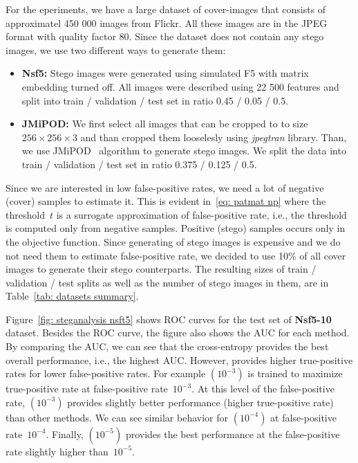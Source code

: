 For the eperiments, we have a large dataset of cover-images that consists of approximatel 450 000 images from Flickr. All these images are in the JPEG format with quality factor 80. Since the dataset does not contain any stego images, we use two different ways to generate them:
\begin{itemize}
  \item \textbf{Nsf5:} Stego images were generated using simulated F5 with matrix embedding turned off. All images were described using 22 500 features and split into train / validation / test set in ratio 0.45 / 0.05 / 0.5.
  \item  \textbf{JMiPOD:} We first select all images that can be cropped to to size $256 \times 256 \times 3$ and than cropped them looselesly using \emph{jpegtran} library. Than, we use JMiPOD~\cite{cogranne2020steganography} algorithm to generate stego images. We split the data into train / validation / test set in ratio 0.375 / 0.125 / 0.5.
\end{itemize}
Since we are interested in low false-positive rates, we need a lot of negative (cover) samples to estimate it. This is evident in~\eqref{eq: patmat np} where the threshold~$t$ is a surrogate approximation of false-positive rate, i.e., the threshold is computed only from negative samples. Positive (stego) samples occurs only in the objective function. Since generating of stego images is expensive and we do not need them to estimate false-positive rate, we decided to use 10\% of all cover images to generate their stego counterparts. The resulting sizes of train / validation / test splits as well as the number of stego images in them, are in Table~\ref{tab: datasets summary}.

Figure~\ref{fig: steganalysis nsft5} shows ROC curves for the test set of \textbf{Nsf5-10} dataset. Besides the ROC curve, the figure also shows the AUC for each method. By comparing the AUC, we can see that the cross-entropy provides the best overall performance, i.e., the highest AUC. However, \PatMatNP provides higher true-positive rates for lower false-positive rates. For example \PatMatNP$\left(10^{-3}\right)$ is trained to maximize true-positive rate at false-positive rate~$10^{-3}.$ At this level of the false-positive rate, \PatMatNP$\left(10^{-3}\right)$ provides slightly better performance (higher true-positive rate) than other methods. We can see similar behavior for \PatMatNP$\left(10^{-4}\right)$ at false-positive rate~$10^{-4}.$ Finally, \PatMatNP$\left(10^{-5}\right)$ provides the best performance at the false-positive rate slightly higher than~$10^{-5}.$


